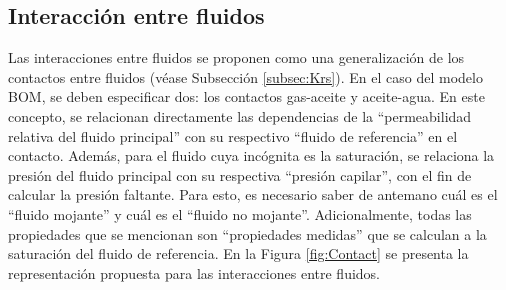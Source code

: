 \subsection{Interacción entre fluidos}\label{subsec:PS_Interphase}
%

Las interacciones entre fluidos se proponen como una generalización de los contactos entre fluidos (véase Subsección \ref{subsec:Krs}). En el caso del modelo BOM, se deben especificar dos: los contactos gas-aceite y aceite-agua. En este concepto, se relacionan directamente las dependencias de la ``permeabilidad relativa del fluido principal'' con su respectivo ``fluido de referencia'' en el contacto. Además, para el fluido cuya incógnita es la saturación, se relaciona la presión del fluido principal con su respectiva ``presión capilar'', con el fin de calcular la presión faltante. Para esto, es necesario saber de antemano cuál es el ``fluido mojante'' y cuál es el ``fluido no mojante''. Adicionalmente, todas las propiedades que se mencionan son ``propiedades medidas'' que se calculan a la saturación del fluido de referencia. En la Figura \ref{fig:Contact} se presenta la representación propuesta para las interacciones entre fluidos.\\

